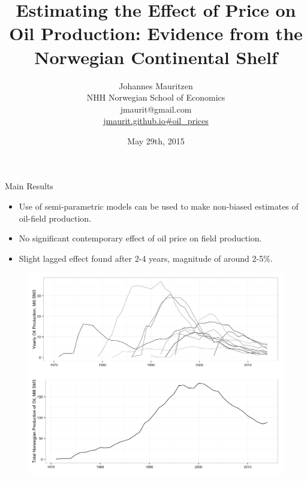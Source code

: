 \documentclass{beamer}
\title[oil]{Estimating the Effect of Price on Oil Production: Evidence from the Norwegian Continental Shelf}
\author{
Johannes Mauritzen \\ 
NHH Norwegian School of Economics \\
jmaurit@gmail.com \\
\url{jmaurit.github.io\#oil\_prices}
}
\date{May 29th, 2015}
\begin{document}
\begin{frame}[plain]
  \titlepage
\end{frame}

\begin{frame}[plain]
	Main Results
	\begin{itemize}
		\item Use of semi-parametric models can be used to make non-biased estimates of oil-field production.
		\item No significant contemporary effect of oil price on field production.
		\item Slight lagged effect found after 2-4 years, magnitude of around 2-5\%.
	\end{itemize}
\end{frame}


\begin{frame}
	\begin{figure}
	\includegraphics[width=1\textwidth]{figures/oil_decline.png}
	\label{oil_decline}
\end{figure}
\end{frame}
\end{document}
